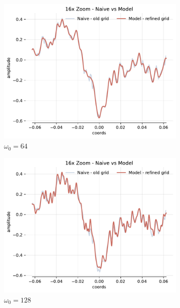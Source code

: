 \begin{figure}[h]
    \begin{subfigure}[b]{0.32\textwidth}
        \centering
        \includegraphics[width=\textwidth]{img/ch4/16x-zoom-1hl-32hf-64hz.pdf}
        \caption{$\omega_0=64$}
        \label{fig:16x-zoom-1hl-32hf-64hz}
    \end{subfigure}
    \begin{subfigure}[b]{0.32\textwidth}
        \centering
        \includegraphics[width=\textwidth]{img/ch4/16x-zoom-1hl-32hf-128hz.pdf}
        \caption{$\omega_0=128$}
        \label{fig:16x-zoom-1hl-32hf-128hz}
    \end{subfigure}
    \begin{subfigure}[b]{0.32\textwidth}

\end{subfigure}
\end{figure}
